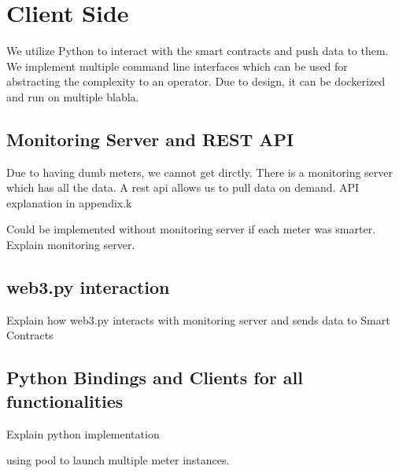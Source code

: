 \section{Client Side}

We utilize Python to interact with the smart contracts and push data to them. We implement multiple command line interfaces which can be used for abstracting the complexity to an operator. Due to design, it can be dockerized and run on multiple blabla.

\subsection{Monitoring Server and REST API}
Due to having dumb meters, we cannot get dirctly. There is a monitoring server which has all the data. A rest api allows us to pull data on demand. API explanation in appendix.k

Could be implemented without monitoring server if each meter was smarter. 
Explain monitoring server.

\subsection{web3.py interaction}
Explain how web3.py interacts with monitoring server and sends data to Smart Contracts

\subsection{Python Bindings and Clients for all functionalities}
Explain python implementation

using pool to launch multiple meter instances.



